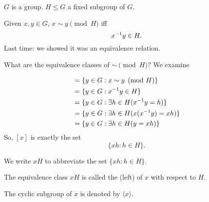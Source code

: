 \documentclass[notes.tex]{subfiles}
\begin{document}


$G$ is a group. $H \le G$ a fixed subgroup of $G$.

Given $x, y\in G$, $x\sim y \pmod H$ iff \[
	{x}^{-1}y\in H.
\]
Last time: we showed it was an equivalence relation.

What are the equivalence classes of $\sim\pmod H$?
We examine 

\begin{align*}
	[x] &= \{y\in G: x\sim y\pmod H\}\\
	&= \{y\in G : \inv xy\in H\}\\
	&= \{y\in G : \exists h \in H (\inv x y = h)\}\\
	&= \{y\in G : \exists h\in H (x(\inv xy)=xh)\}\\
	&= \{y\in G : \exists h \in H (y = xh)\}
\end{align*}
So, $[x]$ is exactly the set \[
	\{xh:h\in H\}.
\]
\begin{notation}
	We write $xH$ to abbreviate the set $\{xh:h\in H\}$.
\end{notation}

\begin{definition}
	The equivalence class $xH$ is called the (left)  of $x$ with respect to $H$.
\end{definition}

\begin{notation}
	The cyclic subgroup of $x$ is denoted by $\langle x\rangle$.
\end{notation}
\end{document}
